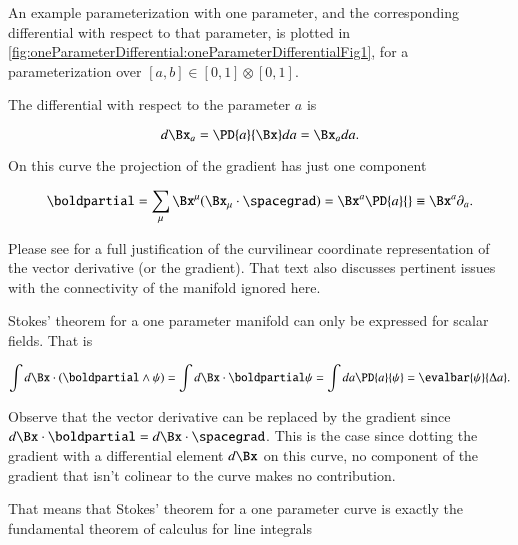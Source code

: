 %
%

An example parameterization with one parameter, and the corresponding differential with respect to that parameter, is plotted in
\cref{fig:oneParameterDifferential:oneParameterDifferentialFig1}, for a parameterization over \( [a, b] \in [0,1]\otimes[0,1] \).


The differential with respect to the parameter \( a \) is

\begin{equation}\label{eqn:stokesTheoremCore:20}
d\Bx_a = \PD{a}{\Bx} da = \Bx_a da.
\end{equation}

On this curve the projection of the gradient has just one component

\begin{dmath}\label{eqn:stokesTheoremCore:40}
\boldpartial
=
\sum_\mu \Bx^\mu (\Bx_\mu \cdot \spacegrad)
=
\Bx^a \PD{a}{}
\equiv
\Bx^a \partial_a.
\end{dmath}

Please see \citep{aMacdonaldVAGC} for a full justification of the curvilinear coordinate representation of the vector derivative (or the gradient).
That text also discusses pertinent issues with the connectivity of the manifold ignored here.

Stokes' theorem for a one parameter manifold can only be expressed for scalar fields.
That is

\begin{dmath}\label{eqn:stokesTheoremCore:60}
\int d\Bx \cdot (\boldpartial \wedge \psi)
=
\int d\Bx \cdot \boldpartial \psi
=
\int da \PD{a}{ \psi }
= \evalbar{\psi}{\Delta a}.
\end{dmath}

Observe that the vector derivative can be replaced by the gradient since \( d\Bx \cdot \boldpartial = d\Bx \cdot \spacegrad \).
This is the case since dotting the
gradient with a differential element \( d\Bx \) on this curve, no component of the gradient that isn't colinear to the curve makes no contribution.

That means that Stokes' theorem for a one parameter curve is exactly the fundamental theorem of calculus for line integrals

